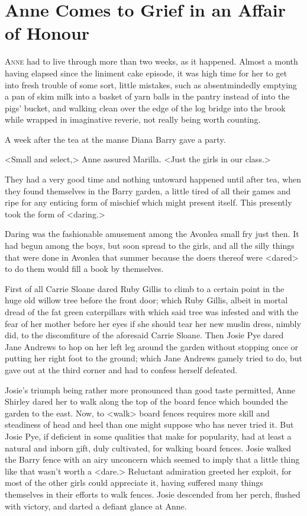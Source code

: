 \chapter{Anne Comes to Grief in an Affair of Honour}

\lettrine{A}{nne} had to live through more than two weeks, as it happened. Almost a month having elapsed since the liniment cake episode, it was high time for her to get into fresh trouble of some sort, little mistakes, such as absentmindedly emptying a pan of skim milk into a basket of yarn balls in the pantry instead of into the pigs' bucket, and walking clean over the edge of the log bridge into the brook while wrapped in imaginative reverie, not really being worth counting.

A week after the tea at the manse Diana Barry gave a party.

<Small and select,> Anne assured Marilla. <Just the girls in our class.>

They had a very good time and nothing untoward happened until after tea, when they found themselves in the Barry garden, a little tired of all their games and ripe for any enticing form of mischief which might present itself. This presently took the form of <daring.>

Daring was the fashionable amusement among the Avonlea small fry just then. It had begun among the boys, but soon spread to the girls, and all the silly things that were done in Avonlea that summer because the doers thereof were <dared> to do them would fill a book by themselves.

First of all Carrie Sloane dared Ruby Gillis to climb to a certain point in the huge old willow tree before the front door; which Ruby Gillis, albeit in mortal dread of the fat green caterpillars with which said tree was infested and with the fear of her mother before her eyes if she should tear her new muslin dress, nimbly did, to the discomfiture of the aforesaid Carrie Sloane. Then Josie Pye dared Jane Andrews to hop on her left leg around the garden without stopping once or putting her right foot to the ground; which Jane Andrews gamely tried to do, but gave out at the third corner and had to confess herself defeated.

Josie's triumph being rather more pronounced than good taste permitted, Anne Shirley dared her to walk along the top of the board fence which bounded the garden to the east. Now, to <walk> board fences requires more skill and steadiness of head and heel than one might suppose who has never tried it. But Josie Pye, if deficient in some qualities that make for popularity, had at least a natural and inborn gift, duly cultivated, for walking board fences. Josie walked the Barry fence with an airy unconcern which seemed to imply that a little thing like that wasn't worth a <dare.> Reluctant admiration greeted her exploit, for most of the other girls could appreciate it, having suffered many things themselves in their efforts to walk fences. Josie descended from her perch, flushed with victory, and darted a defiant glance at Anne.

